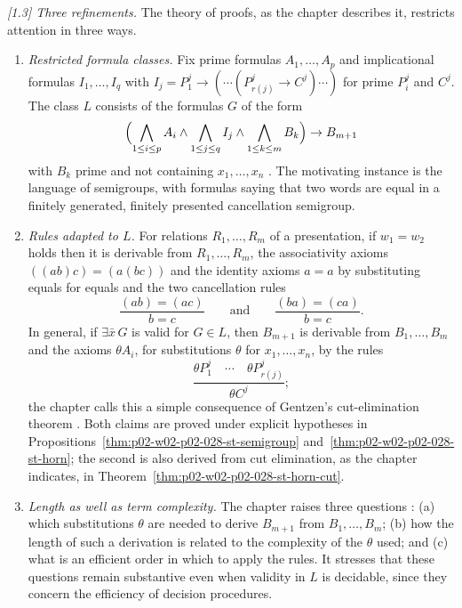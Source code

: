 \emph{[1.3] Three refinements.}  The theory of proofs, as the chapter
describes it, restricts attention in three ways.
\begin{enumerate}
  \item[(i)] \emph{Restricted formula classes.}  Fix prime formulas
        \(A_1,\ldots,A_p\) and implicational formulas \(I_1,\ldots,I_q\) with
        \(I_j=P^j_1\to(\cdots(P^j_{r(j)}\to C^j)\cdots)\) for prime
        \(P^j_i\) and \(C^j\).  The class \(L\) consists of the formulas
        \(G\) of the form
        \[
          \Bigl(\bigwedge_{1\leq i\leq p}A_i\land\bigwedge_{1\leq j\leq q}I_j
          \land\bigwedge_{1\leq k\leq m}B_k\Bigr)\to B_{m+1}
        \]
        with \(B_k\) prime and not containing \(x_1,\ldots,x_n\)
        \cite[\S1.3(i), p.~898]{Statman1977}.  The motivating instance is the
        language of semigroups, with formulas saying that two words are equal
        in a finitely generated, finitely presented cancellation semigroup.
  \item[(ii)] \emph{Rules adapted to \(L\).}  For relations
        \(R_1,\ldots,R_m\) of a presentation, if \(w_1=w_2\) holds then it
        is derivable from \(R_1,\ldots,R_m\), the associativity axioms
        \(((ab)c)=(a(bc))\) and the identity axioms \(a=a\) by substituting
        equals for equals and the two cancellation rules
        \[
          \frac{(ab)=(ac)}{b=c}
          \qquad\text{and}\qquad
          \frac{(ba)=(ca)}{b=c}.
        \]
        In general, if \(\exists\bar x\,G\) is valid for \(G\in L\), then
        \(B_{m+1}\) is derivable from \(B_1,\ldots,B_m\) and the axioms
        \(\theta A_i\), for substitutions \(\theta\) for \(x_1,\ldots,x_n\),
        by the rules
        \[
          \frac{\theta P^j_1\quad\cdots\quad\theta P^j_{r(j)}}{\theta C^j};
        \]
        the chapter calls this a simple consequence of Gentzen's
        cut-elimination theorem \cite[\S1.3(ii), pp.~898--899]{Statman1977}.
        Both claims are proved under explicit hypotheses in
        Propositions~\ref{thm:p02-w02-p02-028-st-semigroup}
        and~\ref{thm:p02-w02-p02-028-st-horn}; the second is also derived
        from cut elimination, as the chapter indicates, in
        Theorem~\ref{thm:p02-w02-p02-028-st-horn-cut}.
  \item[(iii)] \emph{Length as well as term complexity.}  The chapter raises
        three questions \cite[\S1.3(iii), p.~899]{Statman1977}:
        (a) which substitutions \(\theta\) are needed to derive \(B_{m+1}\)
        from \(B_1,\ldots,B_m\);
        (b) how the length of such a derivation is related to the complexity
        of the \(\theta\) used; and
        (c) what is an efficient order in which to apply the rules.
        It stresses that these questions remain substantive even when
        validity in \(L\) is decidable, since they concern the efficiency of
        decision procedures.
\end{enumerate}

